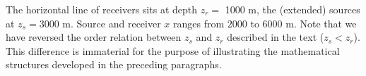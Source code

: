 \documentclass[georeport,12pt]{geophysics}
\begin{document}


The horizontal line of receivers sits at depth $z_r = $ 1000 m, the
(extended) sources at $z_s=3000$ m.  %
Source and receiver $x$ ranges from $2000$ to
$6000$ m. Note that we have
reversed the order relation between $z_s$ and $z_r$ described in the
text ($z_s<z_r$). This difference is immaterial for the purpose of
illustrating the mathematical structures developed in the preceding paragraphs.


\end{document}
